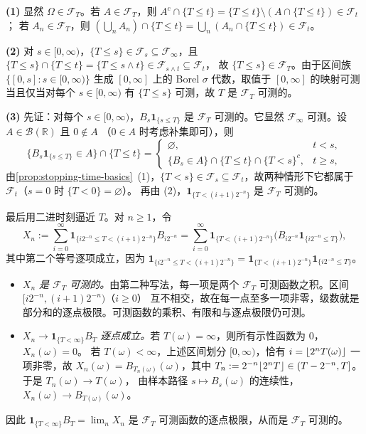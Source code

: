 \documentclass[UTF8,11pt,a4paper,oneside,fontset=fandol]{ctexrep}
\makeatletter
\numberwithin{equation}{section}
\theoremstyle{zhthm}
\renewenvironment{proof}[1][\proofname]{\par
  \pushQED{\qed}%
  \normalfont\topsep6\p@\@plus6\p@\relax
  \trivlist
  \item[\hskip\labelsep\bfseries#1\hspace{0.5em}]\ignorespaces
}{%
  \popQED\endtrivlist\@endpefalse
}
\renewcommand{\proofname}{证明}
\newcommand{\R}{\mathbb{R}}
\newcommand{\B}{\mathcal{B}}
\newcommand{\F}{\mathcal{F}}
\newcommand{\ind}[1]{\mathbf{1}_{#1}}
\DeclarePairedDelimiter{\floor}{\lfloor}{\rfloor}
\makeatother
\begin{document}
\begin{proof}
\textbf{(1)} 显然 $\Omega\in\F_T$。若 $A\in\F_T$，则 $A^c\cap\{T\le t\}=\{T\le t\}\setminus(A\cap\{T\le t\})\in\F_t$；
若 $A_n\in\F_T$，则 $(\bigcup_nA_n)\cap\{T\le t\}=\bigcup_n(A_n\cap\{T\le t\})\in\F_t$。

\textbf{(2)} 对 $s\in[0,\infty)$，$\{T\le s\}\in\F_s\subseteq\F_\infty$，且 $\{T\le s\}\cap\{T\le t\}=\{T\le s\wedge t\}\in\F_{s\wedge t}\subseteq\F_t$，
故 $\{T\le s\}\in\F_T$。由于区间族 $\{[0,s]:s\in[0,\infty)\}$ 生成 $[0,\infty]$ 上的 Borel $\sigma$ 代数，取值于 $[0,\infty]$ 的映射可测当且仅当对每个 $s\in[0,\infty)$ 有 $\{T\le s\}$ 可测\cite[定理 1.3.1]{Durrett2019}\cite[\S1.4.3]{Tao2011}，故 $T$ 是 $\F_T$ 可测的。

\textbf{(3)} 先证：对每个 $s\in[0,\infty)$，$B_s\ind{\{s\le T\}}$ 是 $\F_T$ 可测的。它显然 $\F_\infty$ 可测。设 $A\in\B(\R)$ 且 $0\notin A$
（$0\in A$ 时考虑补集即可），则
\[
  \bigl\{B_s\ind{\{s\le T\}}\in A\bigr\}\cap\{T\le t\}=
  \begin{cases}
    \varnothing, & t<s,\\
    \{B_s\in A\}\cap\{T\le t\}\cap\{T<s\}^c, & t\ge s,
  \end{cases}
\]
由\cref{prop:stopping-time-basics}~(1)，$\{T<s\}\in\F_s\subseteq\F_t$，故两种情形下它都属于 $\F_t$（$s=0$ 时 $\{T<0\}=\varnothing$）。
再由 (2)，$\ind{\{T<(i+1)2^{-n}\}}$ 是 $\F_T$ 可测的。

最后用二进时刻逼近 $T$。对 $n\ge1$，令
\[
  X_n:=\sum_{i=0}^{\infty}\ind{\{i2^{-n}\le T<(i+1)2^{-n}\}}B_{i2^{-n}}
  =\sum_{i=0}^{\infty}\ind{\{T<(i+1)2^{-n}\}}\bigl(B_{i2^{-n}}\ind{\{i2^{-n}\le T\}}\bigr),
\]
其中第二个等号逐项成立，因为 $\ind{\{i2^{-n}\le T<(i+1)2^{-n}\}}=\ind{\{T<(i+1)2^{-n}\}}\ind{\{i2^{-n}\le T\}}$。
\begin{itemize}
  \item \emph{$X_n$ 是 $\F_T$ 可测的。}由第二种写法，每一项是两个 $\F_T$ 可测函数之积。区间 $[i2^{-n},(i+1)2^{-n})$（$i\ge0$）
  互不相交，故在每一点至多一项非零，级数就是部分和的逐点极限。可测函数的乘积、有限和与逐点极限仍可测\cite[\S1.3]{Durrett2019}。
  \item \emph{$X_n\to\ind{\{T<\infty\}}B_T$ 逐点成立。}若 $T(\omega)=\infty$，则所有示性函数为 $0$，$X_n(\omega)=0$。
  若 $T(\omega)<\infty$，上述区间划分 $[0,\infty)$，恰有 $i=\floor{2^nT(\omega)}$ 一项非零，故
  $X_n(\omega)=B_{T_n(\omega)}(\omega)$，其中 $T_n:=2^{-n}\floor{2^nT}\in(T-2^{-n},T]$。于是 $T_n(\omega)\to T(\omega)$，
  由样本路径 $s\mapsto B_s(\omega)$ 的连续性，$X_n(\omega)\to B_{T(\omega)}(\omega)$。
\end{itemize}
因此 $\ind{\{T<\infty\}}B_T=\lim_nX_n$ 是 $\F_T$ 可测函数的逐点极限，从而是 $\F_T$ 可测的。
\end{proof}
\end{document}
